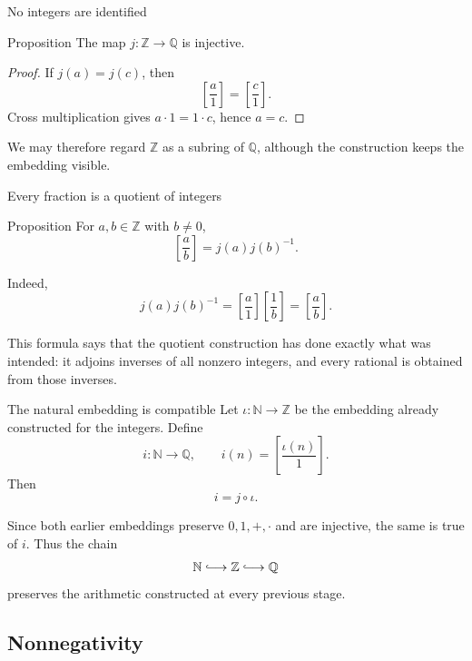 \documentclass[aspectratio=169,11pt]{beamer}
\newcommand{\N}{\mathbb N}
\newcommand{\Z}{\mathbb Z}
\newcommand{\Q}{\mathbb Q}
\newcommand{\qcl}[2]{\left[\frac{#1}{#2}\right]}
\begin{document}
\begin{frame}{No integers are identified}
  \begin{block}{Proposition}
    The map \(j\colon\Z\to\Q\) is injective.
  \end{block}

  \begin{proof}
    If \(j(a)=j(c)\), then
    \[
      \qcl a1=\qcl c1.
    \]
    Cross multiplication gives \(a\cdot1=1\cdot c\), hence \(a=c\).
  \end{proof}

  We may therefore regard \(\Z\) as a subring of \(\Q\), although the
  construction keeps the embedding visible.
\end{frame}

\begin{frame}{Every fraction is a quotient of integers}
  \begin{block}{Proposition}
    For \(a,b\in\Z\) with \(b\ne0\),
    \[
      \boxed{\qcl ab=j(a)j(b)^{-1}.}
    \]
  \end{block}

  Indeed,
  \[
    j(a)j(b)^{-1}
      =\qcl a1\qcl1b
      =\qcl ab.
  \]

  This formula says that the quotient construction has done exactly what was
  intended: it adjoins inverses of all nonzero integers, and every rational is
  obtained from those inverses.
\end{frame}

\begin{frame}{The natural embedding is compatible}
  Let \(\iota\colon\N\to\Z\) be the embedding already constructed for the integers.
  Define
  \[
    i\colon\N\longrightarrow\Q,
    \qquad
    i(n)=\qcl{\iota(n)}1.
  \]
  Then
  \[
    i=j\circ\iota.
  \]

  Since both earlier embeddings preserve \(0,1,+,\cdot\) and are injective,
  the same is true of \(i\).  Thus the chain
  \[
    \N\lhook\joinrel\longrightarrow
    \Z\lhook\joinrel\longrightarrow
    \Q
  \]
  preserves the arithmetic constructed at every previous stage.
\end{frame}

\subsection{Nonnegativity}
\end{document}
